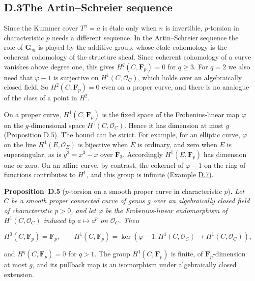 \documentclass[11pt]{article}
\newenvironment{bpstatement}[2]{\par\addvspace{0.6\baselineskip}\noindent\textbf{#1}#2\textbf{.}\enspace\ignorespaces}
  {\par\addvspace{0.4\baselineskip}}
\newenvironment{bpstatementit}[2]{\begin{bpstatement}{#1}{#2}\itshape\ignorespaces}{\end{bpstatement}}
\begin{document}
\subsection*{\texorpdfstring{D.3\quad The Artin–Schreier sequence}{D.3 The Artin–Schreier sequence}}
\label{bp187}%
\label{bp188}%
Since the Kummer cover \(T^n=a\) is étale only when \(n\) is invertible, \(p\)-torsion in characteristic \(p\) needs a different sequence. In the Artin–Schreier sequence the role of \(\mathbf G_m\) is played by the additive group, whose étale cohomology is the coherent cohomology of the structure sheaf. Since coherent cohomology of a curve vanishes above degree one, this gives \(H^q(C,\mathbf F_p)=0\) for \(q\geq3\). For \(q=2\) we also need that \(\varphi-1\) is surjective on \(H^1(C,\mathcal O_C)\), which holds over an algebraically closed field. So \(H^2(C,\mathbf F_p)=0\) even on a proper curve, and there is no analogue of the class of a point in \(H^2\).

On a proper curve, \(H^1(C,\mathbf F_p)\) is the fixed space of the Frobenius-linear map \(\varphi\) on the \(g\)-dimensional space \(H^1(C,\mathcal O_C)\). Hence it has dimension at most \(g\) (Proposition \hyperref[bp189]{D.5}). The bound can be strict. For example, for an elliptic curve, \(\varphi\) on the line \(H^1(E,\mathcal O_E)\) is bijective when \(E\) is ordinary, and zero when \(E\) is supersingular, as is \(y^2=x^3-x\) over \(\overline{\mathbf F}_3\). Accordingly \(H^1(E,\mathbf F_p)\) has dimension one or zero. On an affine curve, by contrast, the cokernel of \(\varphi-1\) on the ring of functions contributes to \(H^1\), and this group is infinite (Example \hyperref[bp195]{D.7}).

\label{bp189}%
\begin{bpstatementit}{Proposition~D.5}{ ($p$-torsion on a smooth proper curve in characteristic $p$)}
Let \(C\) be a smooth proper connected curve of genus \(g\) over an algebraically closed field of characteristic \(p>0\), and let \(\varphi\) be the Frobenius-linear endomorphism of \(H^1(C,\mathcal O_C)\) induced by \(a\mapsto a^p\) on \(\mathcal O_C\).  Then

\[
H^0(C,\mathbf F_p)=\mathbf F_p,\qquad
H^1(C,\mathbf F_p)=
\ker(\varphi-1:H^1(C,\mathcal O_C)\to H^1(C,\mathcal O_C)),
\]

and \(H^q(C,\mathbf F_p)=0\) for \(q>1\).  The group \(H^1(C,\mathbf F_p)\) is finite, of \(\mathbf F_p\)-dimension at most \(g\), and its pullback map is an isomorphism under algebraically closed extension.
\end{bpstatementit}
\end{document}
